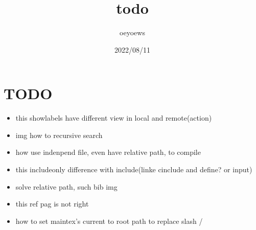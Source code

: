 \documentclass[UTF8]{article}
\title{todo \emoji{check-mark-button}}
\author{oeyoews}
\date{2022/08/11}
\begin{document}
\maketitle

\section{TODO }%
\label{sec:TODO}

\begin{itemize}
	\item this showlabels have different view in local and remote(action)
	\item img how to recursive search
	\item how use indenpend file, even have relative path, to compile
	\item this includeonly difference with include(linke cinclude and define? or
	      input)
	\item solve relative path, such bib img
	\item this ref pag is not right
  \item how to set maintex's current to root path to replace slash /
\end{itemize}
\end{document}
